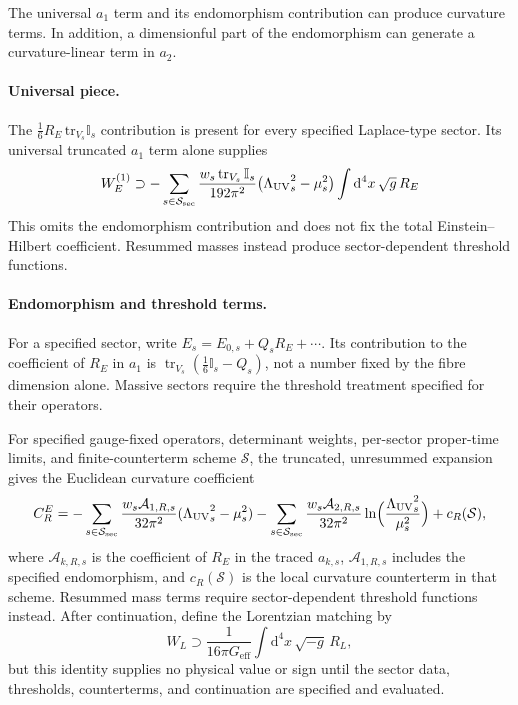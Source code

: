The universal \(a_1\) term and its endomorphism contribution can
produce curvature terms. In addition, a dimensionful part of the
endomorphism can generate a curvature-linear term in \(a_2\).

\paragraph{Universal piece.}
The \(\tfrac16 R_E\,\mathrm{tr}_{V_s}\mathbb{I}_s\) contribution is
present for every specified Laplace-type sector. Its universal
truncated \(a_1\) term alone supplies
\begin{equation}
  \label{eq:universal-R}
  W_E^{(1)}
  \supset
  -\sum_{s\in\mathcal{S}_{\mathrm{sec}}}
    \frac{w_s\operatorname{tr}_{V_s}\mathbb I_s}{192\pi^2}
    \bigl({\Lambda_{\mathrm{UV}}}_s^2-\mu_s^2\bigr)
    \int\mathrm{d}^4x\,\sqrt{g}\,R_E
\end{equation}
This omits the endomorphism contribution and does not fix the total
Einstein--Hilbert coefficient. Resummed masses instead produce
sector-dependent threshold functions.

\paragraph{Endomorphism and threshold terms.}
For a specified sector, write \(E_s=E_{0,s}+Q_sR_E+\cdots\).
Its contribution to the coefficient of \(R_E\) in \(a_1\) is
\(\operatorname{tr}_{V_s}(\tfrac16\mathbb I_s-Q_s)\), not a number
fixed by the fibre dimension alone. Massive sectors require the
threshold treatment specified for their operators.

\begin{theorem}
  \label{thm:Geff}
  For specified gauge-fixed operators, determinant weights,
  per-sector proper-time limits, and finite-counterterm scheme
  \(\mathcal S\), the truncated, unresummed expansion gives the
  Euclidean curvature coefficient
  \begin{equation}
    \label{eq:Geff-thm}
    C_R^E
    =-\sum_{s\in\mathcal{S}_{\mathrm{sec}}}
       \frac{w_s\mathcal A_{1,R,s}}{32\pi^2}
       ({\Lambda_{\mathrm{UV}}}_s^2-\mu_s^2)
     -\sum_{s\in\mathcal{S}_{\mathrm{sec}}}
       \frac{w_s\mathcal A_{2,R,s}}{32\pi^2}
       \ln\Bigl(\frac{{\Lambda_{\mathrm{UV}}}_s^2}{\mu_s^2}\Bigr)
     +c_R(\mathcal S),
  \end{equation}
  where \(\mathcal A_{k,R,s}\) is the coefficient of \(R_E\) in
  the traced \(a_{k,s}\), \(\mathcal A_{1,R,s}\) includes the
  specified endomorphism, and \(c_R(\mathcal S)\) is the local
  curvature counterterm in that scheme. Resummed mass terms require
  sector-dependent threshold functions instead. After continuation,
  define the Lorentzian matching by
  \begin{equation}
    \label{eq:W-EH}
    W_L\supset\frac{1}{16\pi G_{\mathrm{eff}}}
      \int\mathrm{d}^4x\,\sqrt{-g}\,R_L,
  \end{equation}
  but this identity supplies no physical value or sign until the
  sector data, thresholds, counterterms, and continuation are
  specified and evaluated.
\end{theorem}

